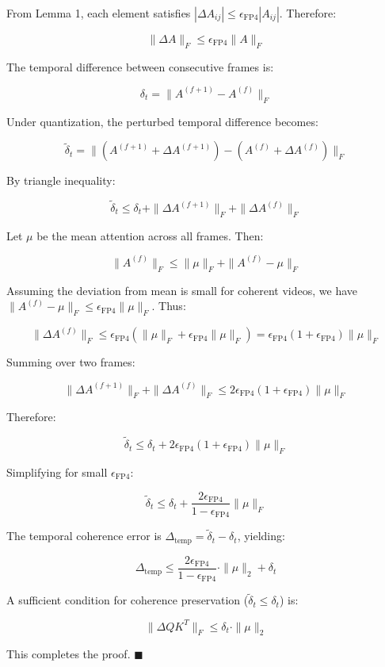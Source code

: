 \documentclass[journal,twoside]{IEEEtran}
\theoremstyle{definition}
\theoremstyle{remark}
\begin{document}
From Lemma 1, each element satisfies $|\Delta A_{ij}| \leq \epsilon_{\text{FP4}} |A_{ij}|$. Therefore:

\[
\|\Delta A\|_F \leq \epsilon_{\text{FP4}} \|A\|_F
\]

The temporal difference between consecutive frames is:

\[
\delta_t = \|A^{(f+1)} - A^{(f)}\|_F
\]

Under quantization, the perturbed temporal difference becomes:

\[
\tilde{\delta}_t = \|(A^{(f+1)} + \Delta A^{(f+1)}) - (A^{(f)} + \Delta A^{(f)})\|_F
\]

By triangle inequality:

\[
\tilde{\delta}_t \leq \delta_t + \|\Delta A^{(f+1)}\|_F + \|\Delta A^{(f)}\|_F
\]

Let $\mu$ be the mean attention across all frames. Then:

\[
\|A^{(f)}\|_F \leq \|\mu\|_F + \|A^{(f)} - \mu\|_F
\]

Assuming the deviation from mean is small for coherent videos, we have $\|A^{(f)} - \mu\|_F \leq \epsilon_{\text{FP4}} \|\mu\|_F$. Thus:

\[
\|\Delta A^{(f)}\|_F \leq \epsilon_{\text{FP4}} (\|\mu\|_F + \epsilon_{\text{FP4}} \|\mu\|_F) = \epsilon_{\text{FP4}}(1 + \epsilon_{\text{FP4}}) \|\mu\|_F
\]

Summing over two frames:

\[
\|\Delta A^{(f+1)}\|_F + \|\Delta A^{(f)}\|_F \leq 2\epsilon_{\text{FP4}}(1 + \epsilon_{\text{FP4}}) \|\mu\|_F
\]

Therefore:

\[
\tilde{\delta}_t \leq \delta_t + 2\epsilon_{\text{FP4}}(1 + \epsilon_{\text{FP4}}) \|\mu\|_F
\]

Simplifying for small $\epsilon_{\text{FP4}}$:

\[
\tilde{\delta}_t \leq \delta_t + \frac{2\epsilon_{\text{FP4}}}{1 - \epsilon_{\text{FP4}}} \|\mu\|_F
\]

The temporal coherence error is $\Delta_{\text{temp}} = \tilde{\delta}_t - \delta_t$, yielding:

\[
\Delta_{\text{temp}} \leq \frac{2\epsilon_{\text{FP4}}}{1 - \epsilon_{\text{FP4}}} \cdot \|\mu\|_2 + \delta_t
\]

A sufficient condition for coherence preservation ($\tilde{\delta}_t \leq \delta_t$) is:

\[
\|\Delta Q K^T\|_F \leq \delta_t \cdot \|\mu\|_2
\]

This completes the proof. \hfill $\blacksquare$
\end{document}
